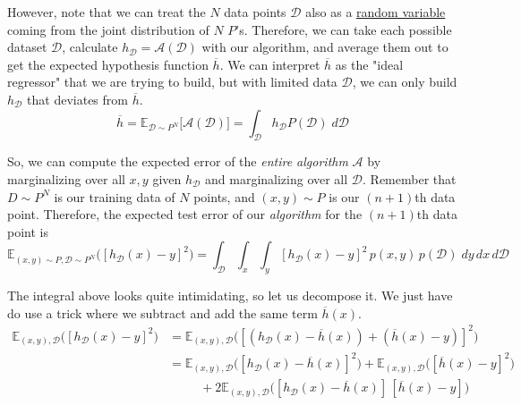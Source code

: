   However, note that we can treat the $N$ data points $\mathcal{D}$ also as a \hyperref[prob-def:random-variable]{random variable} coming from the joint distribution of $N$ $P$'s. Therefore, we can take each possible dataset $\mathcal{D}$, calculate $h_\mathcal{D} = \mathcal{A}(\mathcal{D})$ with our algorithm, and average them out to get the expected hypothesis function $\overline{h}$. We can interpret $\overline{h}$ as the "ideal regressor" that we are trying to build, but with limited data $\mathcal{D}$, we can only build $h_\mathcal{D}$ that deviates from $\overline{h}$.
  \begin{equation}
    \overline{h} = \mathbb{E}_{\mathcal{D} \sim P^N} \big[ \mathcal{A}(\mathcal{D}) \big] = \int_\mathcal{D} h_\mathcal{D} P(\mathcal{D})\; d\mathcal{D}
  \end{equation}

  So, we can compute the expected error of the \textit{entire algorithm} $\mathcal{A}$ by marginalizing over all $x, y$ given $h_\mathcal{D}$ and marginalizing over all $\mathcal{D}$. Remember that $D \sim P^N$ is our training data of $N$ points, and $(x, y) \sim P$ is our $(n+1)$th data point. Therefore, the expected test error of our \textit{algorithm} for the $(n+1)$th data point is
  \begin{equation}
    \mathbb{E}_{(x, y) \sim P, \mathcal{D} \sim P^N} \big( [ h_\mathcal{D} (x) - y]^2 \big) = \int_\mathcal{D} \int_x \int_y [ h_\mathcal{D} (x) - y]^2\, p(x, y) \, p(\mathcal{D})\; dy\,dx\,d\mathcal{D}
  \end{equation}

  The integral above looks quite intimidating, so let us decompose it. We just have do use a trick where we subtract and add the same term $\overline{h}(x)$.
  \begin{align*}
    \mathbb{E}_{(x, y), \mathcal{D}} \big( [ h_\mathcal{D} (x) - y]^2 \big) & = \mathbb{E}_{(x, y), \mathcal{D}} \big( [ (h_\mathcal{D} (x) - \overline{h}(x)) + (\overline{h}(x) - y)]^2 \big) \\
    & = \mathbb{E}_{(x, y), \mathcal{D}} \big( [h_\mathcal{D} (x) - \overline{h} (x)]^2 \big) + 
    \mathbb{E}_{(x, y), \mathcal{D}} \big( [\overline{h} (x) - y]^2 \big) \\
    & \;\;\;\;\;\;\;\;\; + 2 \mathbb{E}_{(x, y), \mathcal{D}} \big([h_\mathcal{D} (x) - \overline{h} (x)]\,[\overline{h} (x) - y] \big)
  \end{align*}

